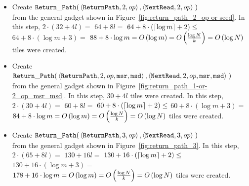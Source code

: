 \begin{itemize}
    \item Create
    $\begin{aligned}[t]
        \returnpath(& \left\langle {\tt ReturnPath}, 2, \inc \right\rangle,
                      \left\langle {\tt NextRead},   2, \inc \right\rangle \;)
    \end{aligned}$\\from the general gadget shown in Figure~\ref{fig:return_path_2_op-or-seed}.
    In this step, $2 \cdot \left( 32 + 4l \right) =$
    $64 + 8l =$
    $64 + 8 \cdot \left( \ceil*{\log m} + 2 \right) \leq$
    $64 + 8 \cdot \left( {\log m} + 3 \right) =$
    $88 + 8 \cdot {\log m} = \bigologm$ tiles were created.
    \vspace{0.5cm}

    \item Create
    $\begin{aligned}[t]
        \returnpath(& \left\langle {\tt ReturnPath}, 2, \inc, {\tt msr}, {\tt msd} \right\rangle,
                      \left\langle {\tt NextRead},   2, \inc, {\tt msr}, {\tt msd} \right\rangle \;)
    \end{aligned}$\\from the general gadget shown in Figure~\ref{fig:return_path_1-or-2_op_msr_msd}. In this step, $30 + 4l$ tiles were created.
    In this step, $2 \cdot \left( 30 + 4l \right) =$
    $60 + 8l =$
    $60 + 8 \cdot \left( \ceil*{\log m} + 2 \right) \leq$
    $60 + 8 \cdot \left( {\log m} + 3 \right) =$
    $84 + 8 \cdot {\log m} = \bigologm$ tiles were created.
    \vspace{0.5cm}

    \item Create
    $\begin{aligned}[t]
        \returnpath(& \left\langle {\tt ReturnPath},  3, \inc \right\rangle,
                      \left\langle {\tt NextRead},    3, \inc \right\rangle \;)
    \end{aligned}$\\from the general gadget shown in Figure~\ref{fig:return_path_3}.
    In this step, $2 \cdot \left( 65 + 8l \right) =$
    $130 + 16l =$
    $130 + 16 \cdot \left( \ceil*{\log m} + 2 \right) \leq$
    $130 + 16 \cdot \left( {\log m} + 3 \right) =$
    $178 + 16 \cdot {\log m} = \bigologm$ tiles were created.
    \vspace{0.5cm}


\end{itemize}
